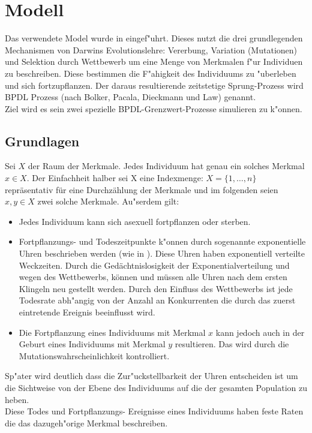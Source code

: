\documentclass[11pt, a4paper, german]{article}
\begin{document}

\clearpage
\section{Modell}
Das verwendete Model wurde in \cite{Bolker_Spatial_moment,Bolker1997179,raey_Dieckmann_Law} eingef"uhrt. Dieses nutzt die drei grundlegenden Mechanismen von Darwins Evolutionslehre: Vererbung, Variation (Mutationen) und Selektion durch Wettbewerb um eine Menge von Merkmalen f"ur Individuen zu beschreiben. Diese bestimmen die F"ahigkeit des Individuums zu "uberleben und sich fortzupflanzen. Der daraus resultierende zeitstetige Sprung-Prozess wird BPDL Prozess (nach Bolker, Pacala, Dieckmann und Law) genannt.\\
Ziel wird es sein zwei spezielle BPDL-Grenzwert-Prozesse simulieren zu k"onnen.
	\subsection{Grundlagen}
	Sei $ X $ der Raum der Merkmale. Jedes Individuum hat genau ein solches Merkmal $ x \in X $. Der Einfachheit halber sei X eine Indexmenge: $ X = \{1,\dots, n\} $ repräsentativ für eine Durchzählung der Merkmale und im folgenden seien $ x,y \in X $ zwei solche Merkmale. Au"serdem gilt:
	\begin{itemize}
		\item Jedes Individuum kann sich asexuell fortpflanzen oder sterben.
		\item Fortpflanzungs- und Todeszeitpunkte k"onnen durch sogenannte exponentielle Uhren beschrieben werden (wie in \cite[S. 3]{fournier2004microscopic}). Diese Uhren haben exponentiell verteilte Weckzeiten. Durch die Gedächtnislosigkeit der Exponentialverteilung und wegen des Wettbewerbs, können und müssen alle Uhren nach dem ersten Klingeln neu gestellt werden. Durch den Einfluss des Wettbewerbs ist jede Todesrate abh"angig von der Anzahl an Konkurrenten die durch das zuerst eintretende Ereignis beeinflusst wird. 
		\item Die Fortpflanzung eines Individuums mit Merkmal $ x $ kann jedoch auch in der Geburt eines Individuums mit Merkmal $ y $ resultieren. Das wird durch die Mutationswahrscheinlichkeit kontrolliert.
	\end{itemize}
	Sp"ater wird deutlich dass die Zur"uckstellbarkeit der Uhren entscheiden ist um die Sichtweise von der Ebene des Individuums auf die der gesamten Population zu heben.\\
	Diese Todes und Fortpflanzungs- Ereignisse eines Individuums haben feste Raten die das dazugeh"orige Merkmal beschreiben.\\
	
\end{document}
